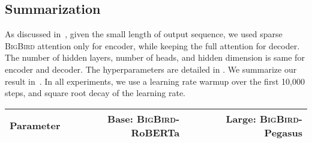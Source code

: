\documentclass{article}
\newcommand{\bigb}{\textsc{BigBird}\xspace}
\begin{document}
\subsection{Summarization\label{sec:appn_summarization}}
As discussed in~,
given the small length of output sequence, we used sparse \bigb attention only for encoder, while keeping the full attention for decoder.
The number of hidden layers, number of heads, and hidden dimension is same for encoder and decoder.
The hyperparameters are detailed in .
We summarize our result in~. In all experiments, we use a learning
rate warmup over the first 10,000 steps, and square root
decay of the learning rate.

\begin{table}[bht]
\small
\centering

\begin{tabular}{@{}l r r c r @{}}

\toprule
Parameter & \multicolumn{2}{r}{Base: \bigb-RoBERTa} & & Large: \bigb-Pegasus \\
\midrule


\end{tabular}
\end{table}
\end{document}
